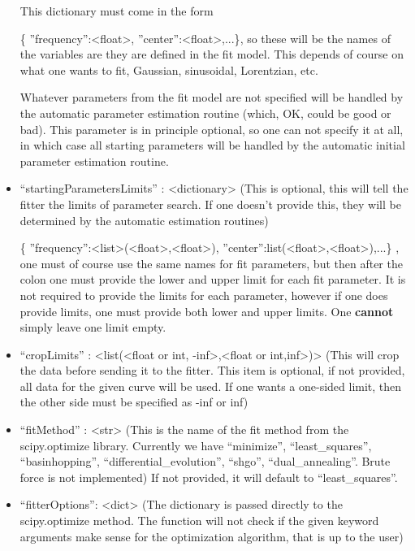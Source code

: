 \documentclass[11pt]{article} %
\begin{document}
\begin{tcolorbox}[breakable,title=Sending ``params'' to the server]
\begin{itemize}
This dictionary must come in the form 

{ \{ {''}frequency{''}:<float>, {''}center{''}:<float>,...\}}, so these will be the names
of the variables are they are defined in the fit model. This depends of course on what one wants to fit, Gaussian, sinusoidal, Lorentzian, etc.

Whatever parameters from the fit model are not specified will be handled 
by the automatic parameter estimation routine (which, OK, could be good or bad). This parameter is in principle optional, so one can not specify it at all, in which case all starting parameters will be handled by the automatic initial parameter estimation routine.

\item ``startingParametersLimits'' : <dictionary> (This is optional, this will tell the fitter the limits of parameter search. If one doesn't provide this, they will be determined by the automatic estimation routines) 

{ \{ {''}frequency{''}:<list>(<float>,<float>), {''}center{''}:list(<float>,<float>),...\} }, 
one must of course use the same names for fit parameters, but then after the colon one must provide the lower and upper limit for each fit parameter. 
It is not required to provide the limits for each parameter, however if one does provide limits, one must provide both lower and upper limits. 
One \textbf{cannot} simply leave one limit empty.

\item ``cropLimits'' : <list(<float or int, -inf>,<float or int,inf>)> (This will crop the data before sending it to the fitter. 
This item is optional, if not provided, all data for the given curve will be used. If one wants a one-sided limit, then the other side must be specified as -inf or inf)

\item ``fitMethod'' : <str> (This is the name of the fit method from the scipy.optimize library. Currently we have ``minimize'', ``least\_squares'', ``basinhopping'', ``differential\_evolution'', ``shgo'', ``dual\_annealing''. Brute force is not implemented)
If not provided, it will default to ``least\_squares''.

\item ``fitterOptions'': <dict> (The dictionary is passed directly to the scipy.optimize method. The function will not check if the given keyword arguments make sense for the optimization algorithm, that is up to the user)


\end{itemize}
\end{tcolorbox}
\end{document}

